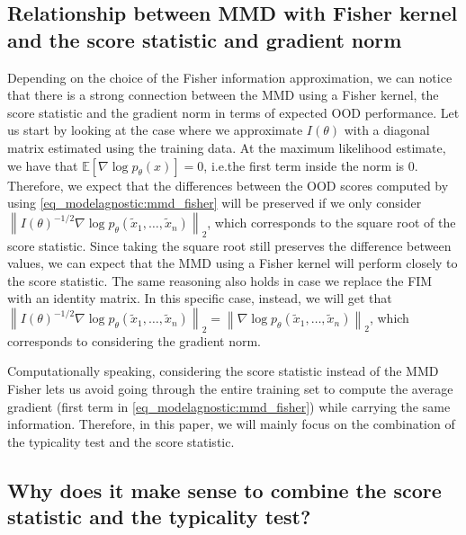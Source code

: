 {\subsection{Relationship between MMD with Fisher kernel and the score statistic and gradient norm} 
Depending on the choice of the Fisher information approximation, we can notice that there is a strong connection between the MMD using a Fisher kernel, the score statistic and the gradient norm in terms of expected OOD performance. Let us start by looking at the case where we approximate $I(\theta)$ with a diagonal matrix estimated using the training data. At the maximum likelihood estimate, we have that $\mathbb{E}[ \nabla \log p_\theta (x)] = 0$, i.e.\@ the first term inside the norm is $0$. Therefore, we expect that the differences between the OOD scores computed by using \cref{eq_modelagnostic:mmd_fisher} will be preserved if we only consider $\left\|I(\theta)^{-1/2} \nabla \log p_\theta (\tilde{x}_1,\dots,\tilde{x}_n)\right\|_2$,
which corresponds to the square root of the score statistic. Since taking the square root still preserves the difference between values, we can expect that the MMD using a Fisher kernel will perform closely to the score statistic. The same reasoning also holds in case we replace the FIM with an identity matrix. In this specific case, instead, we will get that $\left\|{I}(\theta)^{-1/2} \nabla \log p_\theta (\tilde{x}_1,\dots,\tilde{x}_n)\right\|_2 = \left\|\nabla \log p_\theta (\tilde{x}_1,\dots,\tilde{x}_n)\right\|_2 $, which corresponds to considering the gradient norm. 

Computationally speaking, considering the score statistic instead of the MMD Fisher lets us avoid going through the entire training set to compute the average gradient (first term in \cref{eq_modelagnostic:mmd_fisher}) while carrying the same information. Therefore, in this paper, we will mainly focus on the combination of the typicality test and the score statistic.

\subsection{Why does it make sense to combine the score statistic and the typicality test?}

}
